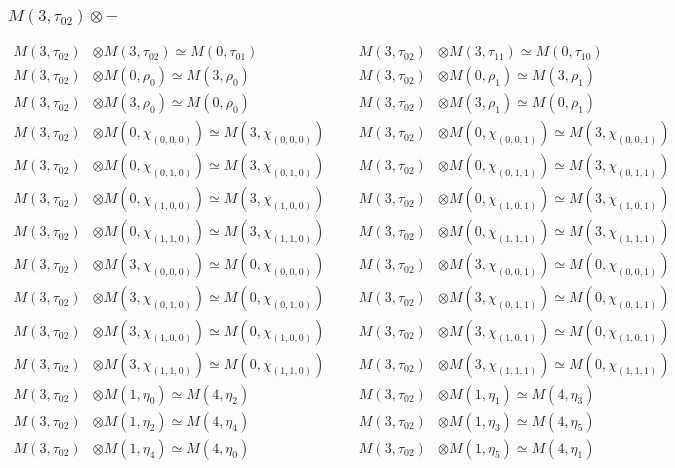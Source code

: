 \subsubsection{$ M(3,\tau_{02})\otimes -$}
\begin{align*}
M(3,\tau_{02}) &\otimes M(3,\tau_{02}) \simeq M(0,\tau_{01}) &&& M(3,\tau_{02}) &\otimes M(3,\tau_{11}) \simeq M(0,\tau_{10})\\
M(3,\tau_{02}) &\otimes M(0,\rho_{0}) \simeq M(3,\rho_{0}) &&& M(3,\tau_{02}) &\otimes M(0,\rho_{1}) \simeq M(3,\rho_{1})\\
M(3,\tau_{02}) &\otimes M(3,\rho_{0}) \simeq M(0,\rho_{0}) &&& M(3,\tau_{02}) &\otimes M(3,\rho_{1}) \simeq M(0,\rho_{1})\\
M(3,\tau_{02}) &\otimes M(0,\chi_{(0,0,0)}) \simeq M(3,\chi_{(0,0,0)}) &&& M(3,\tau_{02}) &\otimes M(0,\chi_{(0,0,1)}) \simeq M(3,\chi_{(0,0,1)})\\
M(3,\tau_{02}) &\otimes M(0,\chi_{(0,1,0)}) \simeq M(3,\chi_{(0,1,0)}) &&& M(3,\tau_{02}) &\otimes M(0,\chi_{(0,1,1)}) \simeq M(3,\chi_{(0,1,1)})\\
M(3,\tau_{02}) &\otimes M(0,\chi_{(1,0,0)}) \simeq M(3,\chi_{(1,0,0)}) &&& M(3,\tau_{02}) &\otimes M(0,\chi_{(1,0,1)}) \simeq M(3,\chi_{(1,0,1)})\\
M(3,\tau_{02}) &\otimes M(0,\chi_{(1,1,0)}) \simeq M(3,\chi_{(1,1,0)}) &&& M(3,\tau_{02}) &\otimes M(0,\chi_{(1,1,1)}) \simeq M(3,\chi_{(1,1,1)})\\
M(3,\tau_{02}) &\otimes M(3,\chi_{(0,0,0)}) \simeq M(0,\chi_{(0,0,0)}) &&& M(3,\tau_{02}) &\otimes M(3,\chi_{(0,0,1)}) \simeq M(0,\chi_{(0,0,1)})\\
M(3,\tau_{02}) &\otimes M(3,\chi_{(0,1,0)}) \simeq M(0,\chi_{(0,1,0)}) &&& M(3,\tau_{02}) &\otimes M(3,\chi_{(0,1,1)}) \simeq M(0,\chi_{(0,1,1)})\\
M(3,\tau_{02}) &\otimes M(3,\chi_{(1,0,0)}) \simeq M(0,\chi_{(1,0,0)}) &&& M(3,\tau_{02}) &\otimes M(3,\chi_{(1,0,1)}) \simeq M(0,\chi_{(1,0,1)})\\
M(3,\tau_{02}) &\otimes M(3,\chi_{(1,1,0)}) \simeq M(0,\chi_{(1,1,0)}) &&& M(3,\tau_{02}) &\otimes M(3,\chi_{(1,1,1)}) \simeq M(0,\chi_{(1,1,1)})\\
M(3,\tau_{02}) &\otimes M(1,\eta_{0}) \simeq M(4,\eta_{2}) &&& M(3,\tau_{02}) &\otimes M(1,\eta_{1}) \simeq M(4,\eta_{3})\\
M(3,\tau_{02}) &\otimes M(1,\eta_{2}) \simeq M(4,\eta_{4}) &&& M(3,\tau_{02}) &\otimes M(1,\eta_{3}) \simeq M(4,\eta_{5})\\
M(3,\tau_{02}) &\otimes M(1,\eta_{4}) \simeq M(4,\eta_{0}) &&& M(3,\tau_{02}) &\otimes M(1,\eta_{5}) \simeq M(4,\eta_{1})\\

\end{align*}
